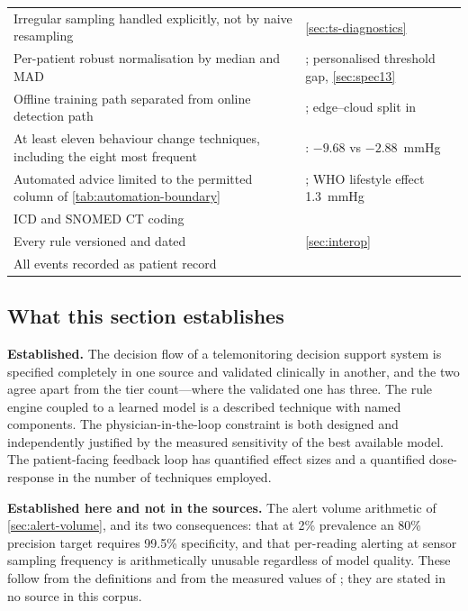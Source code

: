 \documentclass[12pt,a4paper,oneside]{report}
\begin{document}
\begin{table}[htbp]
\begin{tabularx}{\textwidth}{@{}X >{\raggedright\arraybackslash}p{5.9cm}@{}}
Irregular sampling handled explicitly, not by naive resampling & \cref{sec:ts-diagnostics} \\
Per-patient robust normalisation by median and MAD & \textcite{liu2025review}; personalised threshold gap, \cref{sec:spec13} \\
Offline training path separated from online detection path & \textcite{liu2025review}; edge--cloud split in \textcite{mucchi2021} \\
At least eleven behaviour change techniques, including the eight most frequent & \textcite{zhou2024}: $-9.68$ vs $-2.88$~mmHg \\
Automated advice limited to the permitted column of \cref{tab:automation-boundary} & \textcite{mendoza2025}; WHO lifestyle effect 1.3~mmHg \\
ICD and SNOMED CT coding & \textcite{liu2025review} \\
Every rule versioned and dated & \cref{sec:interop} \\
All events recorded as patient record & \textcite{yazdani2018} \\
\bottomrule
\end{tabularx}
\end{table}

\subsection{What this section establishes}\label{sec:cdss-conclusion}

\textbf{Established.} The decision flow of a telemonitoring decision support system is specified completely in one source and validated clinically in another, and the two agree apart from the tier count---where the validated one has three. The rule engine coupled to a learned model is a described technique with named components. The physician-in-the-loop constraint is both designed and independently justified by the measured sensitivity of the best available model. The patient-facing feedback loop has quantified effect sizes and a quantified dose-response in the number of techniques employed.

\textbf{Established here and not in the sources.} The alert volume arithmetic of \cref{sec:alert-volume}, and its two consequences: that at 2\% prevalence an 80\% precision target requires 99.5\% specificity, and that per-reading alerting at sensor sampling frequency is arithmetically unusable regardless of model quality. These follow from the definitions and from the measured values of \textcite{mendoza2025}; they are stated in no source in this corpus.
\end{document}
